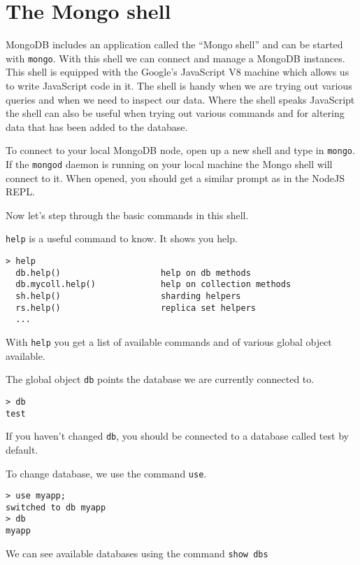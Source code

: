 \section{The Mongo shell}\label{sec:the_mongo_shell}
MongoDB includes an application called the ``Mongo shell'' and can be started with \texttt{mongo}. With this shell we can connect and manage a MongoDB instances. This shell is equipped with the Google's JavaScript V8 machine which allows us to write JavaScript code in it. The shell is handy when we are trying out various queries and when we need to inspect our data. Where the shell speaks JavaScript the shell can also be useful when trying out various commands and for altering data that has been added to the database.

To connect to your local MongoDB node, open up a new shell and type in \texttt{mongo}. If the \texttt{mongod} daemon is running on your local machine the Mongo shell will connect to it. When opened, you should get a similar prompt as in the NodeJS REPL.

Now let's step through the basic commands in this shell.

\texttt{help} is a useful command to know. It shows you help.

\begin{lstlisting}
> help
  db.help()                    help on db methods
  db.mycoll.help()             help on collection methods
  sh.help()                    sharding helpers
  rs.help()                    replica set helpers
  ...
\end{lstlisting}

With \texttt{help} you get a list of available commands and of various global object available.

The global object \texttt{db} points the database we are currently connected to.

\begin{lstlisting}
> db
test
\end{lstlisting}

If you haven't changed \texttt{db}, you should be connected to a database called test by default.

To change database, we use the command \texttt{use}.

\begin{lstlisting}
> use myapp;
switched to db myapp
> db
myapp
\end{lstlisting}

We can see available databases using the command \texttt{show dbs}

